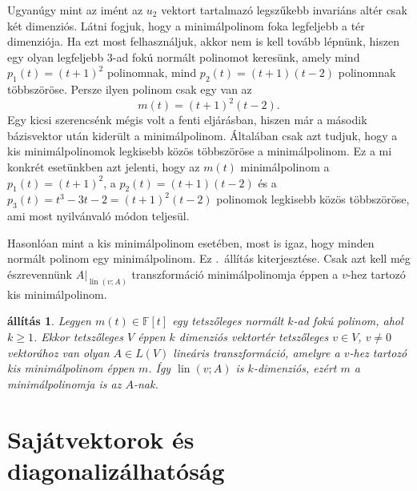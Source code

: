 \documentclass[9pt, a4paper, showtrims]{memoir}
\theoremstyle{plain}
\newtheorem{proposition}{állítás}[chapter]
\theoremstyle{remark}
\theoremstyle{definition}
\DeclareMathOperator{\lin}{lin}
\begin{document}
Ugyanúgy mint az imént az $u_2$ vektort tartalmazó legszűkebb invariáns altér csak két dimenziós.
Látni fogjuk, hogy a minimálpolinom foka legfeljebb a tér dimenziója. 
Ha ezt most felhasználjuk, akkor nem is kell tovább lépnünk, hiszen egy olyan legfeljebb 3-ad fokú normált polinomot keresünk, amely mind $p_1\left( t \right)=\left( t+1 \right)^2$ polinomnak,
mind $p_2\left( t \right)=\left( t+1 \right)\left( t-2 \right)$ polinomnak többszöröse.
Persze ilyen polinom csak egy van az
\[
    m\left( t \right)=\left( t+1 \right)^2\left( t-2 \right).
\]
Egy kicsi szerencsénk mégis volt a fenti eljárásban, 
hiszen már a második bázisvektor után kiderült a minimálpolinom. 
Általában csak azt tudjuk, hogy a kis minimálpolinomok legkisebb közös többszöröse a minimálpolinom.
Ez a mi konkrét esetünkben azt jelenti, 
hogy az $m(t)$ minimálpolinom a $p_1(t)=\left( t+1 \right)^2$, 
a $p_2\left( t \right)=(t+1)(t-2)$ és a $p_3(t)=t^3-3t-2=\left( t+1 \right)^2\left( t-2 \right)$ polinomok legkisebb közös többszöröse, ami most nyilvánvaló módon teljesül.

Hasonlóan mint a kis minimálpolinom esetében, most is igaz, hogy minden normált polinom egy minimálpolinom.
Ez .~állítás kiterjesztése. 
Csak azt kell még észrevennünk $A|_{\lin\left( v;A \right)}$ transzformáció minimálpolinomja éppen a $v$-hez tartozó
kis minimálpolinom.
\begin{proposition}\label{pr:polinom-minimalpolinom}
    Legyen $m\left( t \right)\in\mathbb{F}\left[ t \right]$ egy tetszőleges normált $k$-ad fokú polinom, ahol $k\geq 1$.
    Ekkor tetszőleges $V$ éppen $k$ dimenziós vektortér tetszőleges $v\in V$, $v\neq 0$ vektorához van olyan $A\in L\left( V \right)$
    lineáris transzformáció, 
    amelyre a $v$-hez tartozó kis minimálpolinom éppen $m$.
    Így $\lin\left( v;A \right)$ is $k$-dimenziós, ezért $m$ a minimálpolinomja is az $A$-nak.
\end{proposition}
\section{Sajátvektorok és diagonalizálhatóság}
\end{document}
